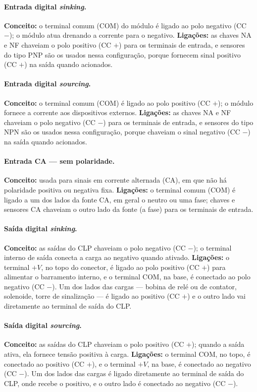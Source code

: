 \paragraph{Entrada digital \emph{sinking}.} \textbf{Conceito:} o terminal comum (COM) do módulo é
ligado ao polo negativo (CC $-$); o módulo atua drenando a corrente para o negativo.
\textbf{Ligações:} as chaves NA e NF chaveiam o polo positivo (CC $+$) para os terminais de entrada,
e sensores do tipo PNP são os usados nessa configuração, porque fornecem sinal positivo (CC $+$) na
saída quando acionados.

\paragraph{Entrada digital \emph{sourcing}.} \textbf{Conceito:} o terminal comum (COM) é ligado ao
polo positivo (CC $+$); o módulo fornece a corrente aos dispositivos externos.
\textbf{Ligações:} as chaves NA e NF chaveiam o polo negativo (CC $-$) para os terminais de entrada,
e sensores do tipo NPN são os usados nessa configuração, porque chaveiam o sinal negativo (CC $-$)
na saída quando acionados.

\paragraph{Entrada CA --- sem polaridade.} \textbf{Conceito:} usada para sinais em corrente alternada
(CA), em que não há polaridade positiva ou negativa fixa. \textbf{Ligações:} o terminal comum (COM) é
ligado a um dos lados da fonte CA, em geral o neutro ou uma fase; chaves e sensores CA chaveiam o
outro lado da fonte (a fase) para os terminais de entrada.

\paragraph{Saída digital \emph{sinking}.} \textbf{Conceito:} as saídas do CLP chaveiam o polo
negativo (CC $-$); o terminal interno de saída conecta a carga ao negativo quando ativado.
\textbf{Ligações:} o terminal $+V$, no topo do conector, é ligado ao polo positivo (CC $+$) para
alimentar o barramento interno, e o terminal COM, na base, é conectado ao polo negativo (CC $-$). Um
dos lados das cargas --- bobina de relé ou de contator, solenoide, torre de sinalização --- é ligado
ao positivo (CC $+$) e o outro lado vai diretamente ao terminal de saída do CLP.

\paragraph{Saída digital \emph{sourcing}.} \textbf{Conceito:} as saídas do CLP chaveiam o polo
positivo (CC $+$); quando a saída ativa, ela fornece tensão positiva à carga. \textbf{Ligações:} o
terminal COM, no topo, é conectado ao positivo (CC $+$), e o terminal $+V$, na base, é conectado ao
negativo (CC $-$). Um dos lados das cargas é ligado diretamente ao terminal de saída do CLP, onde
recebe o positivo, e o outro lado é conectado ao negativo (CC $-$).

